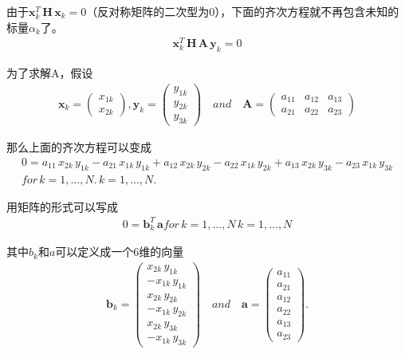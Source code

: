 由于${\mathbf  {x}}_{{k}}^{{T}}\,{\mathbf  {H}}\,{\mathbf  {x}}_{{k}}=0$（反对称矩阵的二次型为0），下面的齐次方程就不再包含未知的标量$\alpha_k$了。
\begin{align}
{\displaystyle \mathbf {x} _{k}^{T}\,\mathbf {H} \,\mathbf {A} \,\mathbf {y} _{k}=0}
\end{align}

为了求解A，假设
\begin{align}
{\mathbf  {x}}_{{k}}={\begin{pmatrix}x_{{1k}}\\x_{{2k}}\end{pmatrix}},   {\displaystyle \mathbf {y} _{k}={\begin{pmatrix}y_{1k}\\y_{2k}\\y_{3k}\end{pmatrix}}}  \quad and \quad {\displaystyle \mathbf {A} ={\begin{pmatrix}a_{11}&a_{12}&a_{13}\\a_{21}&a_{22}&a_{23}\end{pmatrix}}}
\end{align}

那么上面的齐次方程可以变成
\begin{align}
0=a_{{11}}\,x_{{2k}}\,y_{{1k}}-a_{{21}}\,x_{{1k}}\,y_{{1k}}+a_{{12}}\,x_{{2k}}\,y_{{2k}}-a_{{22}}\,x_{{1k}}\,y_{{2k}}+a_{{13}}\,x_{{2k}}\,y_{{3k}}-a_{{23}}\,x_{{1k}}\,y_{{3k}} \nonumber \\
for {\displaystyle \,k=1,\ldots ,N.} \,k=1,\ldots ,N. \nonumber
\end{align}

用矩阵的形式可以写成
\begin{align}
0={\mathbf  {b}}_{{k}}^{{T}}\,{\mathbf  {a}}   for {\displaystyle \,k=1,\ldots ,N} \,k=1,\ldots ,N
\end{align}

其中$b_k$和$a$可以定义成一个6维的向量
\begin{align}
{\mathbf  {b}}_{{k}}={\begin{pmatrix}x_{{2k}}\,y_{{1k}}\\-x_{{1k}}\,y_{{1k}}\\x_{{2k}}\,y_{{2k}}\\-x_{{1k}}\,y_{{2k}}\\x_{{2k}}\,y_{{3k}}\\-x_{{1k}}\,y_{{3k}}\end{pmatrix}}   \quad and  \quad {\displaystyle \mathbf {a} ={\begin{pmatrix}a_{11}\\a_{21}\\a_{12}\\a_{22}\\a_{13}\\a_{23}\end{pmatrix}}.}
\end{align}


